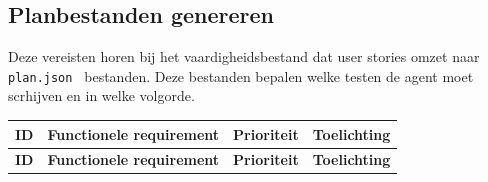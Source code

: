 \subsection{Planbestanden genereren}
Deze vereisten horen bij het vaardigheidsbestand dat user stories omzet naar \texttt{plan.json } bestanden. Deze bestanden bepalen welke testen de agent moet scrhijven en in welke volgorde.

\begin{longtable}{p{}p{}p{}p{}}
    \toprule
    \textbf{ID} & \textbf{Functionele requirement} & \textbf{Prioriteit} & \textbf{Toelichting} \\
    \midrule
    \endfirsthead
    
    \toprule
    \textbf{ID} & \textbf{Functionele requirement} & \textbf{Prioriteit} & \textbf{Toelichting} \\
    \midrule
    \endhead
    

\end{longtable}
